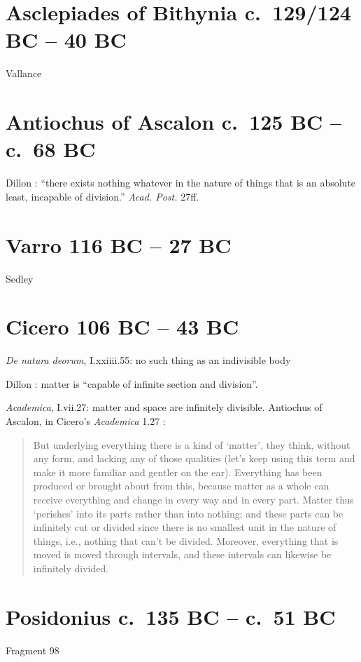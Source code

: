 \documentclass{article}
\begin{document}
\section{Asclepiades of Bithynia c.~129/124 BC -- 40 BC}
Vallance \cite{asclepiades}

\section{Antiochus of Ascalon c.~125 BC -- c.~68 BC}
Dillon \cite[p.~82]{dillon}: ``there exists nothing whatever in the nature of things that is an absolute least,
incapable of division.'' {\em Acad. Post.} 27ff.

\section{Varro 116 BC -- 27 BC}
Sedley \cite{stoicgod}

\section{Cicero 106 BC -- 43 BC}
{\em De natura deorum}, I.xxiiii.55: no such thing as an indivisible body

Dillon \cite[p.~170]{heirs}: matter is ``capable of infinite section and division''.

{\em Academica}, I.vii.27: matter and space are infinitely divisible. Antiochus of Ascalon, in Cicero's {\em Academica} 1.27 \cite[p.~98]{academica}:

\begin{quote}
But underlying everything there is a kind of `matter', they think, without any form, and lacking any of those qualities (let's keep using this term and make it more familiar and gentler
on the ear). Everything has been produced or brought about from this, because matter as a whole can receive everything and change in every way and in every part. Matter thus `perishes' into its parts rather than into nothing; and these parts can be infinitely cut or divided since there is no smallest unit in the nature of things, i.e., nothing that can't be
divided. Moreover, everything that is moved is moved through intervals, and these intervals can likewise be infinitely divided.
\end{quote}

\section{Posidonius c.~135 BC -- c.~51 BC}
Fragment 98 \cite[pp.~395--403]{kidd}
\end{document}
